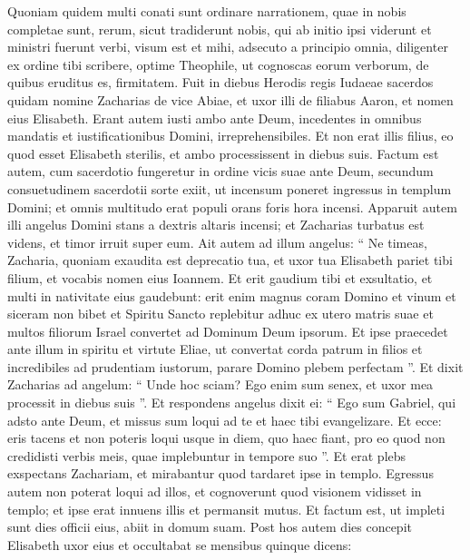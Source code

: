 \begin{biblechapter}
 \verse Quoniam quidem multi conati sunt ordinare narrationem, quae in nobis completae sunt, rerum, 
\verse sicut tradiderunt nobis, qui ab initio ipsi viderunt et ministri fuerunt verbi, 
\verse visum est et mihi, adsecuto a principio omnia, diligenter ex ordine tibi scribere, optime Theophile, 
\verse ut cognoscas eorum verborum, de quibus eruditus es, firmitatem.
 \verse Fuit in diebus Herodis regis Iudaeae sacerdos quidam nomine Zacharias de vice Abiae, et uxor illi de filiabus Aaron, et nomen eius Elisabeth. 
\verse Erant autem iusti ambo ante Deum, incedentes in omnibus mandatis et iustificationibus Domini, irreprehensibiles. 
\verse Et non erat illis filius, eo quod esset Elisabeth sterilis, et ambo processissent in diebus suis.
 \verse Factum est autem, cum sacerdotio fungeretur in ordine vicis suae ante Deum, 
 \verse secundum consuetudinem sacerdotii sorte exiit, ut incensum poneret ingressus in templum Domini; 
\verse et omnis multitudo erat populi orans foris hora incensi. 
\verse Apparuit autem illi angelus Domini stans a dextris altaris incensi; 
\verse et Zacharias turbatus est videns, et timor irruit super eum. 
 \verse Ait autem ad illum angelus: “ Ne timeas, Zacharia, quoniam exaudita est deprecatio tua, et uxor tua Elisabeth pariet tibi filium, et vocabis nomen eius Ioannem. 
\verse Et erit gaudium tibi et exsultatio, et multi in nativitate eius gaudebunt: 
\verse erit enim magnus coram Domino et vinum et siceram non bibet et Spiritu Sancto replebitur adhuc ex utero matris suae 
\verse et multos filiorum Israel convertet ad Dominum Deum ipsorum. 
\verse Et ipse praecedet ante illum in spiritu et virtute Eliae, ut convertat corda patrum in filios et incredibiles ad prudentiam iustorum, parare Domino plebem perfectam ”. 
\verse Et dixit Zacharias ad angelum: “ Unde hoc sciam? Ego enim sum senex, et uxor mea processit in diebus suis ”. 
\verse Et respondens angelus dixit ei: “ Ego sum Gabriel, qui adsto ante Deum, et missus sum loqui ad te et haec tibi evangelizare. 
\verse Et ecce: eris tacens et non poteris loqui usque in diem, quo haec fiant, pro eo quod non credidisti verbis meis, quae implebuntur in tempore suo ”.
 \verse Et erat plebs exspectans Zachariam, et mirabantur quod tardaret ipse in templo. 
\verse Egressus autem non poterat loqui ad illos, et cognoverunt quod visionem vidisset in templo; et ipse erat innuens illis et permansit mutus.
 \verse Et factum est, ut impleti sunt dies officii eius, abiit in domum suam. 
\verse Post hos autem dies concepit Elisabeth uxor eius et occultabat se mensibus quinque dicens: 

\end{biblechapter}
